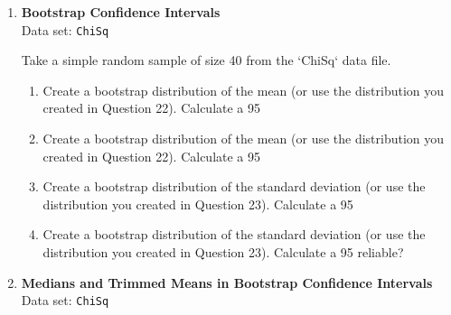 \documentclass[
]{book}
\begin{document}
\begin{enumerate}
\begin{enumerate}
    \item Use the Wilcoxon rank sum test to conduct a significance test for the bird nest study discussed in
Question 48.
    \item Use the Kruskal-Wallis test to conduct a significance test for the bird nest study. Determine whether the distribution of bird size (response is Length) is the same for each nest type. Note that when the chi-square approximation is used, each group should have at least five observations. You may need to create an “other” group to combine all nest types with sample sizes less
than five.
  \end{enumerate}
  
  
  
  
  \item \textbf{Bootstrap Confidence Intervals} \\
  Data set: \texttt{ChiSq} 
  
  Take a simple random sample of size 40 from the `ChiSq` data file.
  \begin{enumerate}
      
    \item Create a bootstrap distribution of the mean (or use the distribution you created in Question 22). Calculate a 95%
    \item Create a bootstrap distribution of the mean (or use the distribution you created in Question 22). Calculate a 95%
    \item Create a bootstrap distribution of the standard deviation (or use the distribution you created in Question 23). Calculate a 95%
    \item Create a bootstrap distribution of the standard deviation (or use the distribution you created in Question 23). Calculate a 95%
reliable?
  \end{enumerate}
  
  
  
  
  
  \item \textbf{Medians and Trimmed Means in Bootstrap Confidence Intervals} \\
  Data set: \texttt{ChiSq}
  \begin{enumerate}
      

\end{enumerate}
\end{enumerate}
\end{document}
